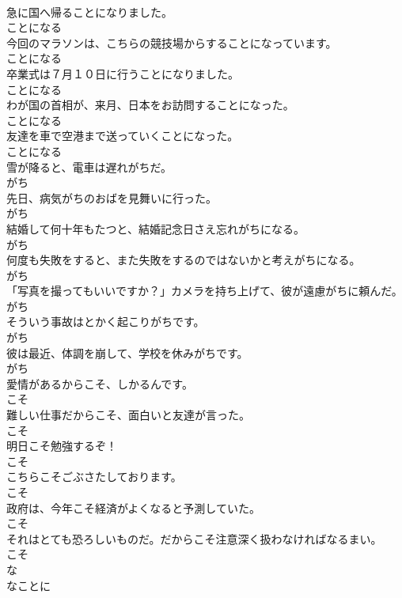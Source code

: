 \documentclass[8pt]{extreport}
\begin{document}
\begin{CJK}{UTF8}{min}
\\	急に国へ帰ることになりました。	
\\	ことになる
\\	今回のマラソンは、こちらの競技場からすることになっています。	
\\	ことになる
\\	卒業式は７月１０日に行うことになりました。	
\\	ことになる
\\	わが国の首相が、来月、日本をお訪問することになった。	
\\	ことになる
\\	友達を車で空港まで送っていくことになった。	
\\	ことになる
\\	雪が降ると、電車は遅れがちだ。	
\\	がち
\\	先日、病気がちのおばを見舞いに行った。	
\\	がち
\\	結婚して何十年もたつと、結婚記念日さえ忘れがちになる。	
\\	がち
\\	何度も失敗をすると、また失敗をするのではないかと考えがちになる。	
\\	がち
\\	「写真を撮ってもいいですか？」カメラを持ち上げて、彼が遠慮がちに頼んだ。	
\\	がち
\\	そういう事故はとかく起こりがちです。	
\\	がち
\\	彼は最近、体調を崩して、学校を休みがちです。	
\\	がち
\\	愛情があるからこそ、しかるんです。	
\\	こそ
\\	難しい仕事だからこそ、面白いと友達が言った。	
\\	こそ
\\	明日こそ勉強するぞ！	
\\	こそ
\\	こちらこそごぶさたしております。	
\\	こそ
\\	政府は、今年こそ経済がよくなると予測していた。	
\\	こそ
\\	それはとても恐ろしいものだ。だからこそ注意深く扱わなければなるまい。	
\\	こそ
\\	な
\\	なことに	

\end{CJK}
\end{document}
